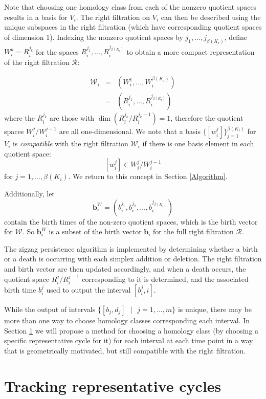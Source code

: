 \documentclass[12pt]{article}
\begin{document}
Note that choosing one homology class from each of the nonzero quotient spaces results in a basis for $V_i$. The right filtration on $V_i$ can then be described using the unique subspaces in the right filtration (which have corresponding quotient spaces of dimension 1). Indexing the nonzero quotient spaces by $j_1,\ldots, j_{\beta(K_i)}$, define $W_i^k = R_i^{j_k}$ for the spaces $R_i^{j_1},\ldots,R_i^{j_{\beta(K_i)}}$ to obtain a more compact representation of the right filtration $\mathcal{R}$:

\begin{eqnarray}\label{Wfiltration}
\mathcal{W}_i & = & (W_i^1, \ldots, W_i^{\beta(K_i)}) \\
& = & (R_i^{j_1}, \ldots, R_i^{j_{\beta(K_i)}}) \nonumber
\end{eqnarray}
where the $R_i^{j_k}$ are those with $\dim(R_i^{j_k}/R_i^{j_k - 1}) = 1$, therefore the quotient spaces $W_i^j/W_i^{j-1}$ are all one-dimensional. We note that a basis $\{[w_i^j]\}_{j=1}^{\beta(K_i)}$ for $V_i$ is \emph{compatible} with the right filtration $\mathcal{W}_i$ if there is one basis element in each quotient space:
\[ [w_i^j] \in W_i^j/W_i^{j-1} \]
for $j = 1,\ldots,\beta(K_i)$. We return to this concept in Section \ref{Algorithm}.

Additionally, let
\[ \mathbf{b}_i^W = (b_i^{j_1}, b_i^{j_2}, \ldots, b_i^{j_{\beta(K_i)}}) \]
contain the birth times of the non-zero quotient spaces, which is the birth vector for $\mathcal{W}$. So $\mathbf{b}_i^W$ is a subset of the birth vector $\mathbf{b}_i$ for the full right filtration $\mathcal{R}$.

The zigzag persistence algorithm is implemented by determining whether a birth or a death is occurring with each simplex addition or deletion. The right filtration and birth vector are then updated accordingly, and when a death occurs, the quotient space $R_i^j/R_i^{j-1}$ corresponding to it is determined, and the associated birth time $b_i^j$ used to output the interval $[b_i^j,i]$.

While the output of intervals $\{[b_j,d_j] \mbox{ } | \mbox{ } j=1,\ldots,m \}$ is unique, there may be more than one way to choose homology classes corresponding each interval. In Section \ref{RepCycles} we will propose a method for choosing a homology class (by choosing a specific representative cycle for it) for each interval at each time point in a way that is geometrically motivated, but still compatible with the right filtration.

\section{Tracking representative cycles}\label{RepCycles}
\end{document}
